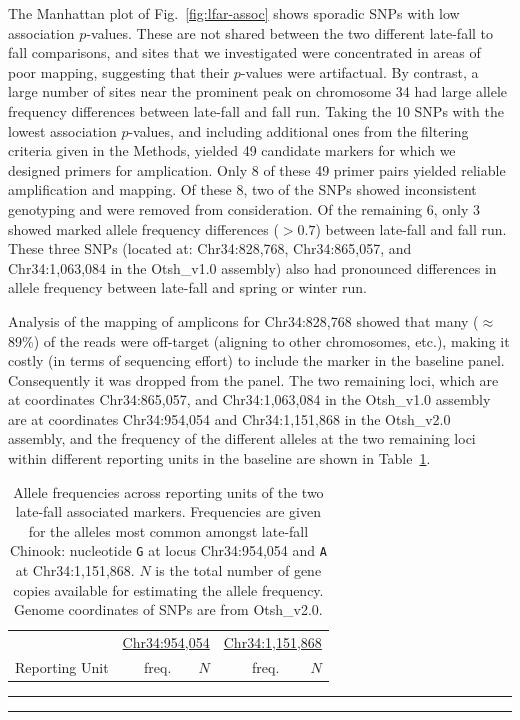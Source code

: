 The Manhattan plot of Fig.~\ref{fig:lfar-assoc} shows sporadic SNPs with low association
$p$-values.  These are not shared between the two different late-fall to fall comparisons, and
sites that we investigated were concentrated in areas of poor mapping, suggesting that their
$p$-values were artifactual.  By contrast, a large number of sites near the prominent peak on
chromosome 34 had large allele frequency differences between late-fall and fall run.  Taking the
10 SNPs with the lowest association $p$-values, and including additional ones from the filtering criteria given in the
Methods, yielded 49 candidate markers for which we designed primers for amplication.  Only 8
of these 49 primer pairs yielded reliable amplification and mapping.   Of these 8, two of the SNPs
showed inconsistent genotyping and were removed from consideration.  Of the remaining 6, only 3
showed marked allele frequency differences ($> 0.7$) between late-fall and fall run.  These three
SNPs (located at: Chr34:828,768,  Chr34:865,057, and Chr34:1,063,084 in the Otsh\_v1.0 assembly)
also had pronounced differences in allele frequency between
late-fall and spring or winter run.

Analysis of the mapping of amplicons for Chr34:828,768
showed that many ($\approx$89\%) of the reads were off-target (aligning to other chromosomes,
etc.), making it costly (in terms of sequencing effort) to include the marker in the baseline panel.
Consequently it was dropped from the panel.  The two remaining loci, which are at coordinates
Chr34:865,057, and Chr34:1,063,084 in the Otsh\_v1.0 assembly are at coordinates
Chr34:954,054 and  Chr34:1,151,868 in the Otsh\_v2.0 assembly, and
the frequency of the different alleles at the two remaining loci
within different reporting units in the baseline are shown in Table~\ref{tab:lfar-freqs}.
\begin{table}
\caption{\footnotesize Allele frequencies across reporting units of the two late-fall associated
markers.  Frequencies are given for the alleles most common amongst late-fall Chinook: nucleotide
{\tt G} at locus Chr34:954,054 and {\tt A} at Chr34:1,151,868.  $N$ is the total number of gene
copies available for estimating the allele frequency. Genome coordinates of SNPs are from Otsh\_v2.0.}
\label{tab:lfar-freqs}
{\footnotesize
\begin{tabular*}{\columnwidth}{@{\extracolsep{\fill}} lrrrr}
\hline\hline
& \multicolumn{2}{c}{\underline{Chr34:954,054}} & \multicolumn{2}{c}{\underline{Chr34:1,151,868}} \\
Reporting Unit & freq. & $N$ & freq. & $N$ \\ \hline

\end{tabular*}
}
\vspace*{-2.3ex}\hrule\vspace*{0.3ex}\hrule
\end{table}

